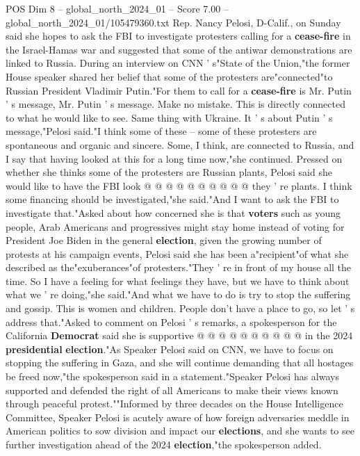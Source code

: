 \begin{textsample}{POS Dim 8 – global\_north\_2024\_01 – Score 7.00 – global\_north\_2024\_01/105479360.txt}  \label{ex:f8_pos_186}
Rep.
Nancy Pelosi, D-Calif., on Sunday said she hopes to ask the FBI to investigate protesters calling for a \textbf{cease-fire} in the Israel-Hamas war and suggested that some of the antiwar demonstrations are linked to Russia.
During an interview on CNN ' s"State of the Union,"the former House speaker shared her belief that some of the protesters are"connected"to Russian President Vladimir Putin."For them to call for a \textbf{cease-fire} is Mr.
Putin ' s message, Mr.
Putin ' s message.
Make no mistake.
This is directly connected to what he would like to see.
Same thing with Ukraine.
It ' s about Putin ' s message,"Pelosi said."I think some of these -- some of these protesters are spontaneous and organic and sincere.
Some, I think, are connected to Russia, and I say that having looked at this for a long time now,"she continued.
Pressed on whether she thinks some of the protesters are Russian plants, Pelosi said she would like to have the FBI look @ @ @ @ @ @ @ @ @ @ they ' re plants.
I think some financing should be investigated,"she said."And I want to ask the FBI to investigate that."Asked about how concerned she is that \textbf{voters} such as young people, Arab Americans and progressives might stay home instead of voting for President Joe Biden in the general \textbf{election}, given the growing number of protests at his campaign events, Pelosi said she has been a"recipient"of what she described as the"exuberances"of protesters."They ' re in front of my house all the time.
So I have a feeling for what feelings they have, but we have to think about what we ' re doing,"she said."And what we have to do is try to stop the suffering and gossip.
This is women and children.
People don't have a place to go, so let ' s address that."Asked to comment on Pelosi ' s remarks, a spokesperson for the California \textbf{Democrat} said she is supportive @ @ @ @ @ @ @ @ @ @ in the 2024 \textbf{presidential} \textbf{election}."As Speaker Pelosi said on CNN, we have to focus on stopping the suffering in Gaza, and she will continue demanding that all hostages be freed now,"the spokesperson said in a statement."Speaker Pelosi has always supported and defended the right of all Americans to make their views known through peaceful protest.""Informed by three decades on the House Intelligence Committee, Speaker Pelosi is acutely aware of how foreign adversaries meddle in American politics to sow division and impact our \textbf{elections}, and she wants to see further investigation ahead of the 2024 \textbf{election},"the spokesperson added.

\end{textsample}
